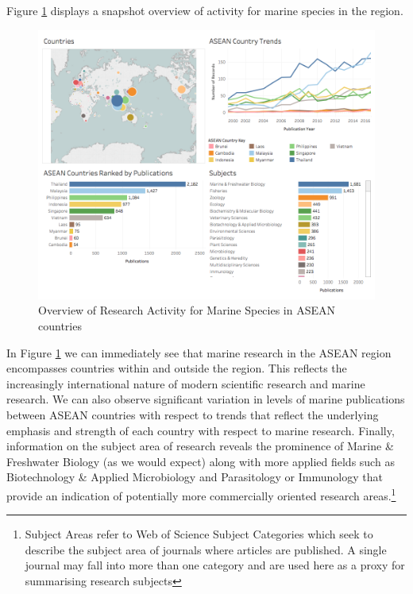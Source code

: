 \documentclass[]{book}
\let\rmarkdownfootnote\footnote%
\def\footnote{\protect\rmarkdownfootnote}
\theoremstyle{definition}
\theoremstyle{definition}
\theoremstyle{definition}
\theoremstyle{remark}
\begin{document}
Figure \ref{fig:marineres} displays a snapshot overview of activity for
marine species in the region.

\begin{figure}

{\centering \includegraphics[width=1\linewidth]{images/aseanmarinlit_overview} 

}

\caption{Overview of Research Activity for Marine Species in ASEAN countries}\label{fig:marineres}
\end{figure}

In Figure \ref{fig:marineres} we can immediately see that marine
research in the ASEAN region encompasses countries within and outside
the region. This reflects the increasingly international nature of
modern scientific research and marine research. We can also observe
significant variation in levels of marine publications between ASEAN
countries with respect to trends that reflect the underlying emphasis
and strength of each country with respect to marine research. Finally,
information on the subject area of research reveals the prominence of
Marine \& Freshwater Biology (as we would expect) along with more
applied fields such as Biotechnology \& Applied Microbiology and
Parasitology or Immunology that provide an indication of potentially
more commercially oriented research areas.\footnote{Subject Areas refer
  to Web of Science Subject Categories which seek to describe the
  subject area of journals where articles are published. A single
  journal may fall into more than one category and are used here as a
  proxy for summarising research subjects}
\end{document}
